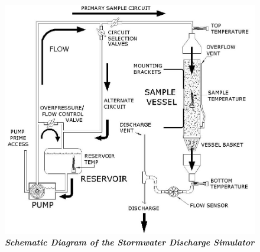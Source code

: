 \documentclass[12pt]{article}
\numberwithin{equation}{section}
\numberwithin{table}{section}
\numberwithin{figure}{section}
\begin{document}
\begin{center}
\begin{figure}
\noindent
\includegraphics[scale=0.5]{DISCHARGER.jpg}
\caption[Stormwater Discharge Simulator Schematic]{\textbf{\emph{Schematic Diagram of the Stormwater Discharge Simulator}}\label{discharger}}
\end{figure}


\end{center}
\end{document}
